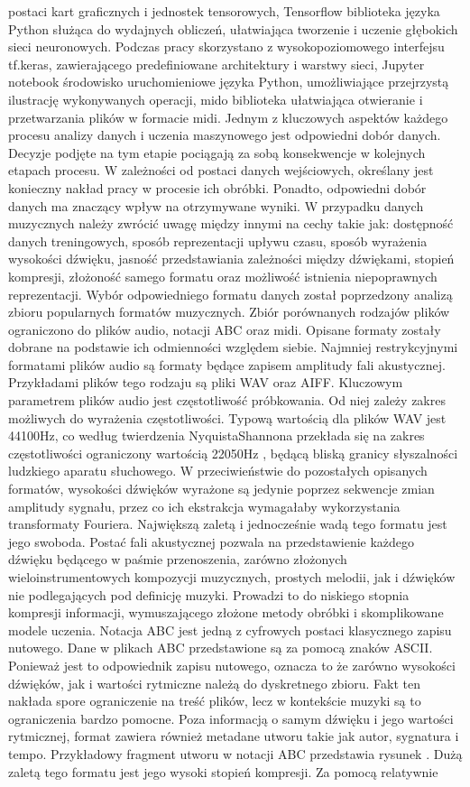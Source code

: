 postaci kart graficznych i jednostek tensorowych,    Tensorflow  biblioteka języka Python służąca do wydajnych obliczeń, ułatwiająca    tworzenie i uczenie głębokich sieci neuronowych. Podczas pracy skorzystano z    wysokopoziomowego interfejsu tf.keras, zawierającego predefiniowane architektury i warstwy sieci,    Jupyter notebook  środowisko uruchomieniowe języka Python, umożliwiające przejrzystą   ilustrację wykonywanych operacji,    mido  biblioteka ułatwiająca otwieranie i przetwarzania plików w formacie midi.    Jednym z kluczowych aspektów każdego procesu analizy danych i uczenia maszynowego jest odpowiedni dobór danych. Decyzje podjęte na tym etapie pociągają za sobą  konsekwencje w kolejnych etapach procesu. W zależności od postaci danych wejściowych, określany jest konieczny nakład pracy w procesie ich obróbki.  Ponadto, odpowiedni dobór danych ma znaczący wpływ na otrzymywane wyniki. W przypadku danych muzycznych należy zwrócić uwagę między innymi na cechy takie jak:  dostępność danych treningowych,  sposób reprezentacji upływu czasu,  sposób wyrażenia wysokości dźwięku,  jasność przedstawiania zależności między dźwiękami,  stopień kompresji,  złożoność samego formatu oraz możliwość istnienia niepoprawnych reprezentacji. Wybór odpowiedniego formatu danych został poprzedzony analizą zbioru popularnych formatów muzycznych. Zbiór porównanych rodzajów plików ograniczono do plików audio, notacji ABC oraz midi. Opisane formaty zostały dobrane na podstawie ich odmienności względem siebie. Najmniej restrykcyjnymi formatami plików audio są formaty będące zapisem amplitudy fali akustycznej. Przykładami plików tego rodzaju są pliki WAV oraz AIFF. Kluczowym parametrem plików audio jest częstotliwość próbkowania. Od niej zależy zakres możliwych do wyrażenia częstotliwości. Typową wartością dla plików WAV jest 44100Hz, co według twierdzenia NyquistaShannona przekłada się na zakres częstotliwości ograniczony wartością 22050Hz , będącą bliską granicy słyszalności ludzkiego aparatu słuchowego.  W przeciwieństwie do pozostałych opisanych formatów, wysokości dźwięków wyrażone są  jedynie poprzez sekwencje zmian amplitudy sygnału, przez co ich ekstrakcja wymagałaby wykorzystania transformaty Fouriera. Największą zaletą i jednocześnie wadą tego formatu jest jego swoboda.  Postać fali akustycznej pozwala na przedstawienie każdego dźwięku będącego w paśmie przenoszenia, zarówno złożonych wieloinstrumentowych kompozycji muzycznych,  prostych melodii, jak i dźwięków nie podlegających pod definicję muzyki.  Prowadzi to do niskiego stopnia kompresji informacji, wymuszającego złożone metody obróbki i skomplikowane modele uczenia. Notacja ABC jest jedną z cyfrowych postaci klasycznego zapisu nutowego. Dane w plikach ABC przedstawione są za pomocą znaków ASCII. Ponieważ jest to odpowiednik zapisu nutowego, oznacza to że zarówno wysokości dźwięków, jak i wartości rytmiczne należą do dyskretnego zbioru. Fakt ten nakłada spore ograniczenie na treść plików, lecz w kontekście muzyki są to  ograniczenia bardzo pomocne. Poza informacją o samym dźwięku i jego wartości rytmicznej, format zawiera również metadane utworu takie jak autor, sygnatura i tempo. Przykładowy fragment utworu w notacji ABC przedstawia rysunek . Dużą zaletą tego formatu jest jego wysoki stopień kompresji. Za pomocą relatywnie 